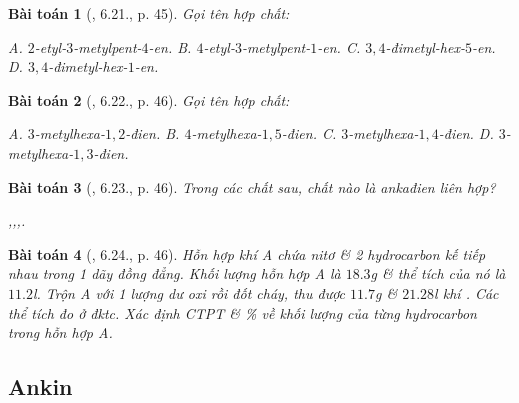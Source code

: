 \documentclass{article}
\newtheorem{baitoan}{Bài toán}
\begin{document}
\begin{baitoan}[\cite{SBT_Hoa_Hoc_11_co_ban}, 6.21., p. 45]
	Gọi tên hợp chất:
	\begin{center}
	\end{center}
	{\sf A.} $2$-etyl-$3$-metylpent-$4$-en. {\sf B.} $4$-etyl-$3$-metylpent-$1$-en. {\sf C.} $3,4$-đimetyl-hex-$5$-en. {\sf D.} $3,4$-đimetyl-hex-$1$-en.
\end{baitoan}

\begin{baitoan}[\cite{SBT_Hoa_Hoc_11_co_ban}, 6.22., p. 46]
	Gọi tên hợp chất:
	\begin{center}
	\end{center}
	{\sf A.} $3$-metylhexa-$1,2$-đien. {\sf B.} $4$-metylhexa-$1,5$-đien. {\sf C.} $3$-metylhexa-$1,4$-đien. {\sf D.} $3$-metylhexa-$1,3$-đien.
\end{baitoan}

\begin{baitoan}[\cite{SBT_Hoa_Hoc_11_co_ban}, 6.23., p. 46]
	Trong các chất sau, chất nào là ankađien liên hợp?
	\begin{center}
		,\hspace{5mm},\hspace{5mm}\emph{},\hspace{5mm}\emph{}.
	\end{center}
\end{baitoan}

\begin{baitoan}[\cite{SBT_Hoa_Hoc_11_co_ban}, 6.24., p. 46]
	Hỗn hợp khí A chứa nitơ \& 2 hydrocarbon kế tiếp nhau trong 1 dãy đồng đẳng. Khối lượng hỗn hợp A là $18.3$\emph{g} \& thể tích của nó là $11.2$\emph{l}. Trộn A với 1 lượng dư oxi rồi đốt cháy, thu được $11.7$\emph{g} \emph{} \& $21.28$\emph{l} khí \emph{}. Các thể tích đo ở đktc. Xác định CTPT \& \% về khối lượng của từng hydrocarbon trong hỗn hợp A.
\end{baitoan}


\subsection{Ankin}
\end{document}
